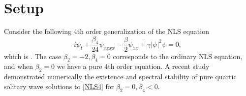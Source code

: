 \documentclass[12pt]{article}
\begin{document}





\section{Setup}

Consider the following 4th order generalization of the NLS equation
\begin{equation}\label{NLS4}
i \psi_t + \frac{\beta_4}{24}\psi_{xxxx} - \frac{\beta}{2}\psi_{xx} + \gamma |\psi|^2 \psi = 0,
\end{equation}
which is \cite[(4)]{Tam2020}. The case $\beta_2 = -2, \beta_4 = 0$ corresponds to the ordinary NLS equation, and when $\beta_2 = 0$ we have a pure 4th order equation. A recent study \cite{Tam2019} demonstrated numerically the existence and spectral stability of pure quartic solitary wave solutions to \cref{NLS4} for $\beta_2 = 0, \beta_4 < 0$.
\end{document}
